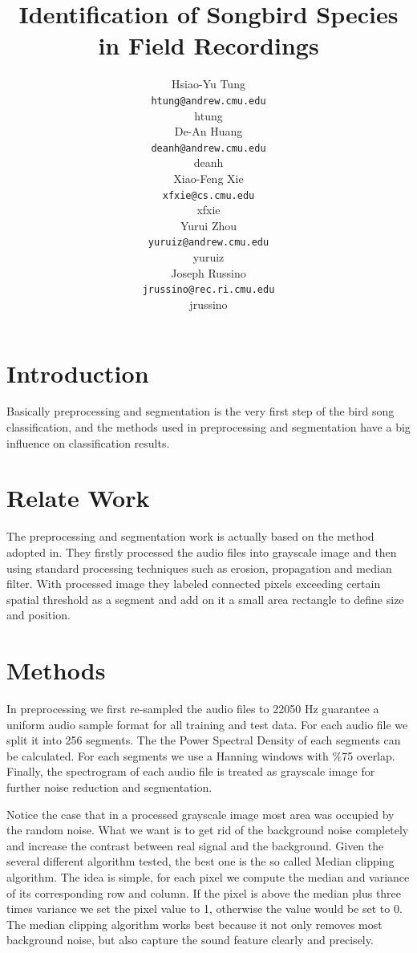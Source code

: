 \documentclass[12pt,peerreview,letterpaper]{IEEEtran}
\title{Identification of Songbird Species in Field Recordings
}
\author{
Hsiao-Yu Tung \\
\texttt{htung@andrew.cmu.edu} \\
htung \\
\And
De-An Huang \\
\texttt{deanh@andrew.cmu.edu} \\
deanh \\
\And
Xiao-Feng Xie \\
\texttt{xfxie@cs.cmu.edu} \\
xfxie \\
\And
Yurui Zhou\\
\texttt{yuruiz@andrew.cmu.edu}\\
yuruiz \\
\And
Joseph Russino\\
\texttt{jrussino@rec.ri.cmu.edu}\\
jrussino \\
}
\begin{document}
\maketitle

\begin{abstract}
\end{abstract}

\section{Introduction}
Basically preprocessing and segmentation is the very first step of the bird song classification, and the methods used in preprocessing and segmentation have a big influence on classification results.

\section{Relate Work}
The preprocessing and segmentation work is actually based on the method adopted in\cite{Lasseck13}. They firstly processed the audio files into grayscale image and then using standard processing techniques such as erosion, propagation and median filter. With processed image they labeled connected pixels exceeding certain spatial threshold as a segment and add on it a small area rectangle to define size and position.

\section{Methods}
In preprocessing we first re-sampled the audio files to 22050 Hz guarantee a uniform audio sample format for all training and test data. For each audio file we split it into 256 segments. The the Power Spectral Density of each segments can be calculated. For each segments we use a Hanning windows with \%75 overlap. Finally, the spectrogram of each audio file is treated as grayscale image for further noise reduction and segmentation.

Notice the case that in a processed grayscale image most area was occupied by the random noise. What we want is to get rid of the background noise completely and increase the contrast between real signal and the background. Given the several different algorithm tested, the best one is the so called Median clipping algorithm. The idea is simple, for each pixel we compute the median and variance of its corresponding row and column. If the pixel is above the median plus three times variance we set the pixel value to 1, otherwise the value would be set to 0. The median clipping algorithm works best because it not only removes most background noise, but also capture the sound feature clearly and precisely.
\end{document}
